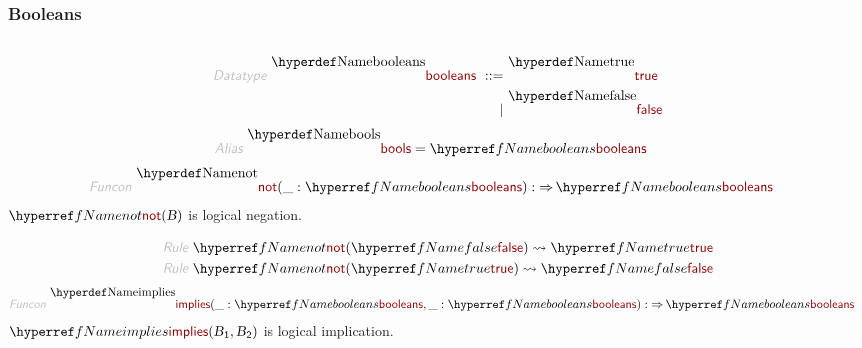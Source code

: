 \subsubsection*{Booleans}\hypertarget{booleans}{}\label{booleans}

\begin{align*}
  [ ~ 
  \KEY{Datatype} ~ & \NAMEREF{booleans} \\
  \KEY{Alias} ~ & \NAMEREF{bools} \\
  \KEY{Funcon} ~ & \NAMEREF{true} \\
  \KEY{Funcon} ~ & \NAMEREF{false} \\
  \KEY{Funcon} ~ & \NAMEREF{not} \\
  \KEY{Funcon} ~ & \NAMEREF{implies} \\
  \KEY{Funcon} ~ & \NAMEREF{and} \\
  \KEY{Funcon} ~ & \NAMEREF{or} \\
  \KEY{Funcon} ~ & \NAMEREF{exclusive-or} \\
  \KEY{Alias} ~ & \NAMEREF{xor}
  ~ ]
\end{align*}
\begin{align*}
  \KEY{Datatype} ~ 
  \NAMEDECL{booleans}  
  ~ ::= ~ & 
  \NAMEDECL{true}  \\
  ~ \mid ~ & \NAMEDECL{false} 
\end{align*}
\begin{align*}
  \KEY{Alias} ~ 
  & \NAMEDECL{bools} = \NAMEREF{booleans}
\end{align*}
\begin{align*}
  \KEY{Funcon} ~ 
  & \NAMEDECL{not}(\_ : \NAMEREF{booleans}) :  \TO \NAMEREF{booleans}
\end{align*}
$\SHADE{\NAMEREF{not}
           ( \VAR{B} )}$   is logical negation.

\begin{align*}
  \KEY{Rule} ~ 
    & \NAMEREF{not}
        ( \NAMEREF{false} ) \leadsto
        \NAMEREF{true}
\\
  \KEY{Rule} ~ 
    & \NAMEREF{not}
        ( \NAMEREF{true} ) \leadsto
        \NAMEREF{false}
\end{align*}
\begin{align*}
  \KEY{Funcon} ~ 
  & \NAMEDECL{implies}(\_ : \NAMEREF{booleans}, \_ : \NAMEREF{booleans}) :  \TO \NAMEREF{booleans}
\end{align*}
$\SHADE{\NAMEREF{implies}
           ( \VAR{B}\SUB{1},   
             \VAR{B}\SUB{2} )}$ is logical implication.

